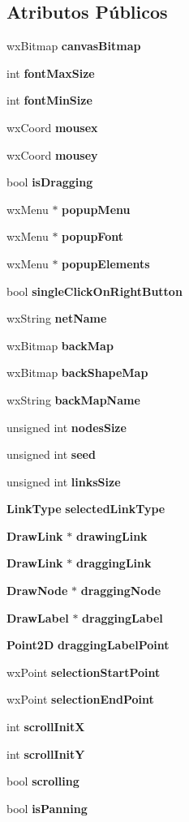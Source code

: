 \subsection*{Atributos Públicos}
\begin{DoxyCompactItemize}
\item 
wx\+Bitmap {\bf canvas\+Bitmap}
\item 
int {\bf font\+Max\+Size}
\item 
int {\bf font\+Min\+Size}
\item 
wx\+Coord {\bf mousex}
\item 
wx\+Coord {\bf mousey}
\item 
bool {\bf is\+Dragging}
\item 
wx\+Menu $\ast$ {\bf popup\+Menu}
\item 
wx\+Menu $\ast$ {\bf popup\+Font}
\item 
wx\+Menu $\ast$ {\bf popup\+Elements}
\item 
bool {\bf single\+Click\+On\+Right\+Button}
\item 
wx\+String {\bf net\+Name}
\item 
wx\+Bitmap {\bf back\+Map}
\item 
wx\+Bitmap {\bf back\+Shape\+Map}
\item 
wx\+String {\bf back\+Map\+Name}
\item 
unsigned int {\bf nodes\+Size}
\item 
unsigned int {\bf seed}
\item 
unsigned int {\bf links\+Size}
\item 
{\bf Link\+Type} {\bf selected\+Link\+Type}
\item 
{\bf Draw\+Link} $\ast$ {\bf drawing\+Link}
\item 
{\bf Draw\+Link} $\ast$ {\bf dragging\+Link}
\item 
{\bf Draw\+Node} $\ast$ {\bf dragging\+Node}
\item 
{\bf Draw\+Label} $\ast$ {\bf dragging\+Label}
\item 
{\bf Point2D} {\bf dragging\+Label\+Point}
\item 
wx\+Point {\bf selection\+Start\+Point}
\item 
wx\+Point {\bf selection\+End\+Point}
\item 
int {\bf scroll\+InitX}
\item 
int {\bf scroll\+InitY}
\item 
bool {\bf scrolling}
\item 
bool {\bf is\+Panning}
\item 

\end{DoxyCompactItemize}
